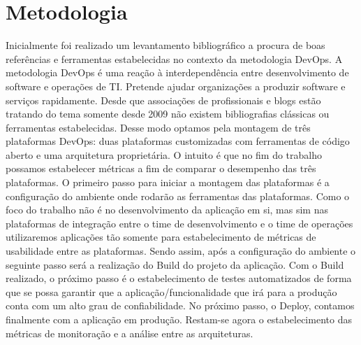 \chapter{Metodologia}

Inicialmente foi realizado um levantamento bibliográfico a procura de boas referências e ferramentas estabelecidas no contexto da metodologia DevOps. A metodologia DevOps é uma reação à interdependência entre desenvolvimento de software e operações de TI. Pretende ajudar organizações a produzir software e serviços rapidamente. Desde que associações de profissionais e blogs estão tratando do tema somente desde 2009 não existem bibliografias clássicas ou ferramentas estabelecidas. Desse modo optamos pela montagem de três plataformas DevOps: duas plataformas customizadas com ferramentas de código aberto e uma arquitetura proprietária. O intuito é que no fim do trabalho possamos estabelecer métricas a fim de comparar o desempenho das três plataformas.
O primeiro passo para iniciar a montagem das plataformas é a configuração do ambiente onde rodarão as ferramentas das plataformas.
Como o foco do trabalho não é no desenvolvimento da aplicação em si, mas sim nas plataformas de integração entre o time de desenvolvimento e o time de operações utilizaremos aplicações tão somente para estabelecimento de métricas de usabilidade entre as plataformas. Sendo assim, após a configuração do ambiente o seguinte passo será a realização do Build do projeto da aplicação.
Com o Build realizado, o próximo passo é o estabelecimento de testes automatizados de forma que se possa garantir que a aplicação/funcionalidade que irá para a produção conta com um alto grau de confiabilidade.
No próximo passo, o Deploy, contamos finalmente com a aplicação em produção. Restam-se agora o estabelecimento das métricas de monitoração e a análise entre as arquiteturas.
